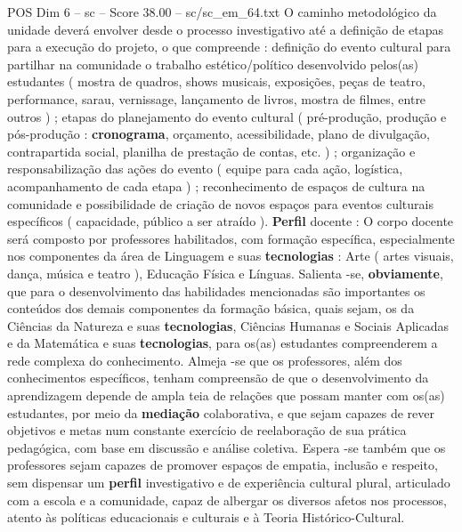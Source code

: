 \begin{textsample}{POS Dim 6 – sc – Score 38.00 – sc/sc\_em\_64.txt}
O caminho metodológico da unidade deverá envolver desde o processo investigativo até a definição de etapas para a execução do projeto, o que compreende : definição do evento cultural para partilhar na comunidade o trabalho estético/político desenvolvido pelos(as) estudantes ( mostra de quadros, shows musicais, exposições, peças de teatro, performance, sarau, vernissage, lançamento de livros, mostra de filmes, entre outros ) ; etapas do planejamento do evento cultural ( pré-produção, produção e pós-produção : \textbf{cronograma}, orçamento, acessibilidade, plano de divulgação, contrapartida social, planilha de prestação de contas, etc. ) ; organização e responsabilização das ações do evento ( equipe para cada ação, logística, acompanhamento de cada etapa ) ; reconhecimento de espaços de cultura na comunidade e possibilidade de criação de novos espaços para eventos culturais específicos ( capacidade, público a ser atraído ). \textbf{Perfil} docente : O corpo docente será composto por professores habilitados, com formação específica, especialmente nos componentes da área de Linguagem e suas \textbf{tecnologias} : Arte ( artes visuais, dança, música e teatro ), Educação Física e Línguas.
Salienta -se, \textbf{obviamente}, que para o desenvolvimento das habilidades mencionadas são importantes os conteúdos dos demais componentes da formação básica, quais sejam, os da Ciências da Natureza e suas \textbf{tecnologias}, Ciências Humanas e Sociais Aplicadas e da Matemática e suas \textbf{tecnologias}, para os(as) estudantes compreenderem a rede complexa do conhecimento.
Almeja -se que os professores, além dos conhecimentos específicos, tenham compreensão de que o desenvolvimento da aprendizagem depende de ampla teia de relações que possam manter com os(as) estudantes, por meio da \textbf{mediação} colaborativa, e que sejam capazes de rever objetivos e metas num constante exercício de reelaboração de sua prática pedagógica, com base em discussão e análise coletiva.
Espera -se também que os professores sejam capazes de promover espaços de empatia, inclusão e respeito, sem dispensar um \textbf{perfil} investigativo e de experiência cultural plural, articulado com a escola e a comunidade, capaz de albergar os diversos afetos nos processos, atento às políticas educacionais e culturais e à Teoria Histórico-Cultural.

\end{textsample}
